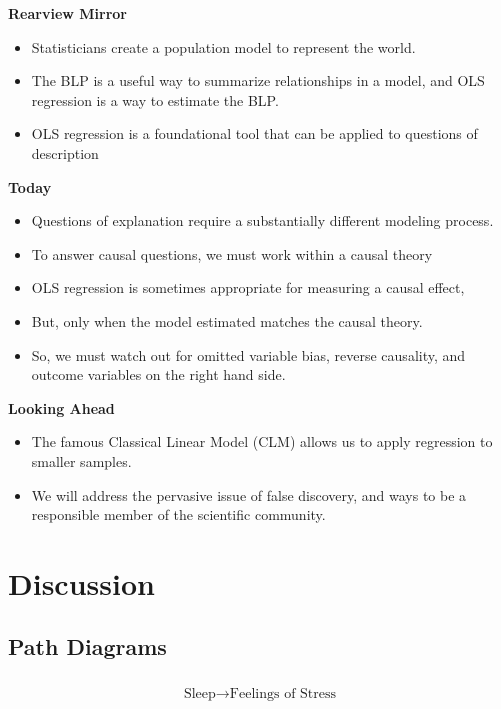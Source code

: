 \documentclass[
]{book}
\providecommand{\tightlist}{%
  \setlength{\itemsep}{0pt}\setlength{\parskip}{0pt}}
\theoremstyle{definition}
\theoremstyle{definition}
\theoremstyle{definition}
\theoremstyle{definition}
\theoremstyle{remark}
\begin{document}
\textbf{Rearview Mirror}

\begin{itemize}
\tightlist
\item
  Statisticians create a population model to represent the world.
\item
  The BLP is a useful way to summarize relationships in a model, and OLS regression is a way to estimate the BLP.
\item
  OLS regression is a foundational tool that can be applied to questions of description
\end{itemize}

\textbf{Today}

\begin{itemize}
\tightlist
\item
  Questions of explanation require a substantially different modeling process.
\item
  To answer causal questions, we must work within a causal theory
\item
  OLS regression is sometimes appropriate for measuring a causal effect,
\item
  But, only when the model estimated matches the causal theory.
\item
  So, we must watch out for omitted variable bias, reverse causality, and outcome variables on the right hand side.
\end{itemize}

\textbf{Looking Ahead}

\begin{itemize}
\tightlist
\item
  The famous Classical Linear Model (CLM) allows us to apply regression to smaller samples.
\item
  We will address the pervasive issue of false discovery, and ways to be a responsible member of the scientific community.
\end{itemize}

\hypertarget{discussion-1}{%
\section{Discussion}\label{discussion-1}}

\hypertarget{path-diagrams}{%
\subsection{Path Diagrams}\label{path-diagrams}}

\[
\begin{matrix}
\\
\text{Sleep} \rightarrow \text{Feelings of Stress} \\
\\
\end{matrix}
\]
\end{document}
